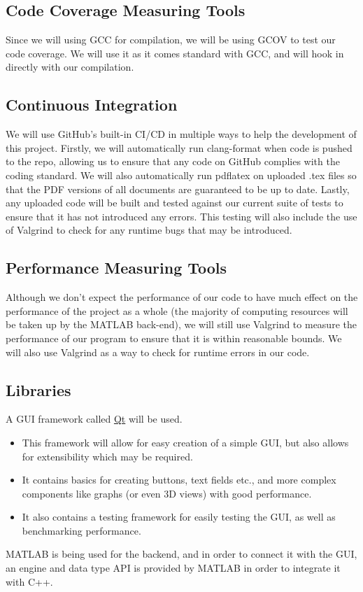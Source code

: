 \documentclass{article}
\begin{document}
\subsection{Code Coverage Measuring Tools}
Since we will using GCC for compilation, we will be using GCOV to test our code coverage. We will use it as
it comes standard with GCC, and will hook in directly with our compilation.

\subsection{Continuous Integration}
We will use GitHub's built-in CI/CD in multiple ways to help the development of this project. Firstly, we will automatically run clang-format when code is pushed to the repo, allowing us to ensure that any code on GitHub complies with the coding standard.
We will also automatically run pdflatex on uploaded .tex files so that the PDF versions of all documents are guaranteed to be up to date. Lastly, any uploaded code will be built and tested against our current suite of tests to ensure that it has not introduced any errors.
This testing will also include the use of Valgrind to check for any runtime bugs that may be introduced.

\subsection{Performance Measuring Tools}
Although we don't expect the performance of our code to have much effect on the performance of the project as a whole (the majority of computing resources will be taken up by the MATLAB back-end), we will still use Valgrind to measure the performance of our program to ensure that
it is within reasonable bounds. We will also use Valgrind as a way to check for runtime errors in our code.

\subsection{Libraries}
A GUI framework called \href{https://www.qt.io/}{Qt} will be used.
\begin{itemize}
	\item This framework will allow for easy creation of a simple GUI, but also allows for extensibility which may be required.
	\item It contains basics for creating buttons, text fields etc., and more complex components like graphs (or even 3D views) with good performance.
	\item It also contains a testing framework for easily testing the GUI, as well as benchmarking performance.
\end{itemize}
MATLAB is being used for the backend, and in order to connect it with the GUI, an engine and data type API is 
provided by MATLAB in order to integrate it with C++.
\end{document}
